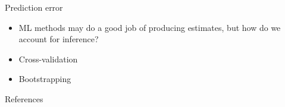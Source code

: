 \documentclass[xcolor={dvipsnames},handout]{beamer}
\begin{document}
\begin{frame}{Prediction error}

\begin{itemize}
\item ML methods may do a good job of producing estimates, but how do we account for inference?
\item Cross-validation
\item Bootstrapping
\end{itemize}

\end{frame}




\backupbegin
\begin{frame}[allowframebreaks]{References}
    
    
\end{frame}

\backupend
\end{document}
